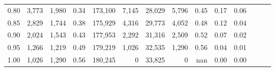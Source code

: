 \begin{tabular}{rrrrrrrrrrrrrr}
0.80 &   3,773 &  1,980 &  0.34 &  173,100 &    7,145 &  28,029 &   5,796 &  0.45 &  0.17 &      0.06 \\
0.85 &   2,829 &  1,744 &  0.38 &  175,929 &    4,316 &  29,773 &   4,052 &  0.48 &  0.12 &      0.04 \\
0.90 &   2,024 &  1,543 &  0.43 &  177,953 &    2,292 &  31,316 &   2,509 &  0.52 &  0.07 &      0.02 \\
0.95 &   1,266 &  1,219 &  0.49 &  179,219 &    1,026 &  32,535 &   1,290 &  0.56 &  0.04 &      0.01 \\
1.00 &   1,026 &  1,290 &  0.56 &  180,245 &        0 &  33,825 &       0 &   nan &  0.00 &      0.00 \\
\bottomrule
\end{tabular}
